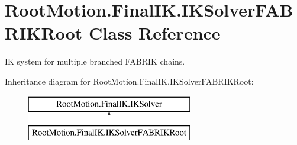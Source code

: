 \hypertarget{class_root_motion_1_1_final_i_k_1_1_i_k_solver_f_a_b_r_i_k_root}{}\section{Root\+Motion.\+Final\+I\+K.\+I\+K\+Solver\+F\+A\+B\+R\+I\+K\+Root Class Reference}
\label{class_root_motion_1_1_final_i_k_1_1_i_k_solver_f_a_b_r_i_k_root}


IK system for multiple branched F\+A\+B\+R\+IK chains.  


Inheritance diagram for Root\+Motion.\+Final\+I\+K.\+I\+K\+Solver\+F\+A\+B\+R\+I\+K\+Root\+:\begin{figure}[H]
\begin{center}
\leavevmode
\includegraphics[height=2.000000cm]{class_root_motion_1_1_final_i_k_1_1_i_k_solver_f_a_b_r_i_k_root}
\end{center}
\end{figure}
